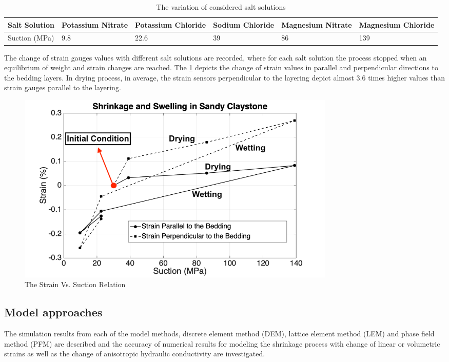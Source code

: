 \begin{table}[h!]
\centering
\begin{center}
\begin{tabular}{ | m{5em} || m{5em}| m{5em} | m{5em} | m{5em} | m{5em} |} 
\hline
Salt Solution & Potassium Nitrate & Potassium Chloride & Sodium Chloride & Magnesium Nitrate & Magnesium Chloride  \\
\hline
 Suction (MPa)  & 9.8 & 22.6 & 39 & 86 & 139   \\ 
\hline
\end{tabular}
\end{center}
\caption{The variation of considered salt solutions}
\label{table:Amir_ME6_SaltSolutions}
\end{table}

The change of strain gauges values with different salt solutions are recorded, where for each salt solution the process stopped when an equilibrium of weight and strain changes are reached. The \ref{fig:Amir_ME6_Experimental_Strain} depicts the change of strain values in parallel and perpendicular directions to the bedding layers. In drying process, in average, the strain sensors perpendicular to the layering depict almost 3.6 times higher values than strain gauges parallel to the layering. 

\begin{figure}[!ht]
\centering
\includegraphics[width=0.75\textwidth]{figures/Amir_ME6_Experimental_Strain.png}
\caption{The Strain Vs. Suction Relation}
\label{fig:Amir_ME6_Experimental_Strain}
\end{figure}

\subsection{Model approaches}

The simulation results from each of the model methods, discrete element method (DEM), lattice element method (LEM) and phase field method (PFM) are described and the accuracy of numerical results for modeling the shrinkage process with change of linear or volumetric strains as well as the change of anisotropic hydraulic conductivity are investigated. 

